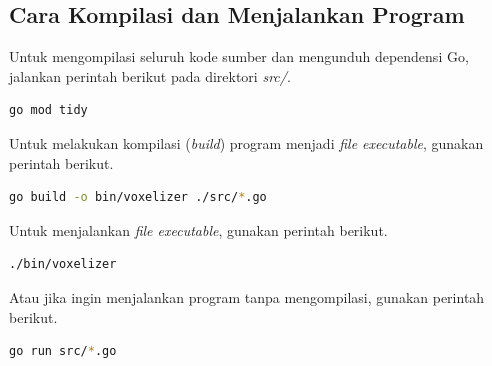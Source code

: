 \subsection{Cara Kompilasi dan Menjalankan Program}\label{sec:Cara
Kompilasi dan Menjalankan Program} %
Untuk mengompilasi seluruh kode sumber dan mengunduh dependensi
Go, jalankan perintah berikut pada direktori \textit{src/}.
\begin{lstlisting}[language=bash, basicstyle=\ttfamily\small, breaklines=true]
    go mod tidy
\end{lstlisting}

\noindent Untuk melakukan kompilasi (\textit{build}) program menjadi \textit{file executable}, gunakan perintah berikut.
\begin{lstlisting}[language=bash, basicstyle=\ttfamily\small, breaklines=true]
    go build -o bin/voxelizer ./src/*.go
\end{lstlisting}

\noindent Untuk menjalankan \textit{file executable}, gunakan perintah berikut.
\begin{lstlisting}[language=bash, basicstyle=\ttfamily\small, breaklines=true]
    ./bin/voxelizer
\end{lstlisting}

\noindent Atau jika ingin menjalankan program tanpa mengompilasi, gunakan perintah berikut.
\begin{lstlisting}[language=bash, basicstyle=\ttfamily\small, breaklines=true]
    go run src/*.go
\end{lstlisting}

